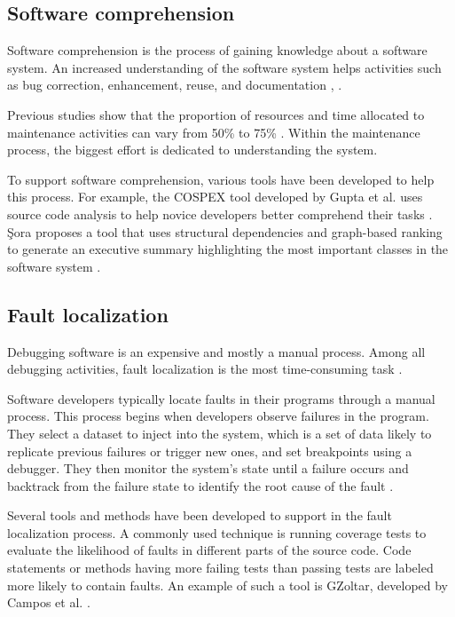 \subsection{Software comprehension}
Software comprehension is the process of gaining knowledge about a software system. An increased understanding of the software system helps activities such as bug correction, enhancement, reuse, and documentation \cite{Comprehension}, \cite{1199197}. 

Previous studies show that the proportion of resources and time allocated to maintenance activities can vary from 50\% to 75\% \cite{articleLientz}. Within the maintenance process, the biggest effort is dedicated to understanding the system.

To support software comprehension, various tools have been developed to help this process. For example, the COSPEX tool developed by Gupta et al. uses source code analysis to help novice developers better comprehend their tasks \cite{Comprehension-Gupta}. Şora proposes a tool that uses structural dependencies and graph-based ranking to generate an executive summary highlighting the most important classes in the software system \cite{enase15}.


\subsection{Fault localization}

Debugging software is an expensive and mostly a manual process. Among all debugging activities, fault localization is the most time-consuming task \cite{articleDebugging}. 

Software developers typically locate faults in their programs through a manual process. This process begins when developers observe failures in the program. They select a dataset to inject into the system, which is a set of data likely to replicate previous failures or trigger new ones, and set breakpoints using a debugger. They then monitor the system's state until a failure occurs and backtrack from the failure state to identify the root cause of the fault \cite{fault-localization, program-failures}. 

Several tools and methods have been developed to support in the fault localization process. A commonly used technique is running coverage tests to evaluate the likelihood of faults in different parts of the source code. Code statements or methods having more failing tests than passing tests are labeled more likely to contain faults. An example of such a tool is GZoltar, developed by Campos et al. \cite{fault-gz}. 

